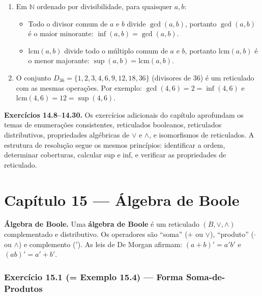 \documentclass[12pt,a4paper]{article}
\newcommand{\keyword}[1]{\textbf{\textcolor{azul}{#1}}}
\begin{document}
\begin{enumerate}[label=(\alph*)]
  \item Em $\mathbb{N}$ ordenado por divisibilidade, para quaisquer $a, b$:
        \begin{itemize}
          \item Todo o divisor comum de $a$ e $b$ divide $\gcd(a,b)$, portanto
                $\gcd(a,b)$ é o maior minorante: $\inf(a,b) = \gcd(a,b)$.
          \item $\text{lcm}(a,b)$ divide todo o múltiplo comum de $a$ e $b$, portanto
                $\text{lcm}(a,b)$ é o menor majorante: $\sup(a,b) = \text{lcm}(a,b)$.
        \end{itemize}

  \item O conjunto $D_{36} = \{1,2,3,4,6,9,12,18,36\}$ (divisores de 36) é um reticulado
        com as mesmas operações. Por exemplo: $\gcd(4,6) = 2 = \inf(4,6)$ e
        $\text{lcm}(4,6) = 12 = \sup(4,6)$.
\end{enumerate}

\medskip
\noindent\textbf{Exercícios 14.8--14.30.} Os exercícios adicionais do capítulo aprofundam
os temas de enumerações consistentes, reticulados booleanos, reticulados distributivos,
propriedades algébricas de $\vee$ e $\wedge$, e isomorfismos de reticulados. A estrutura
de resolução segue os mesmos princípios: identificar a ordem, determinar coberturas,
calcular sup e inf, e verificar as propriedades de reticulado.

\newpage
\part*{Capítulo 15 — Álgebra de Boole}

\begin{teoriacaixa}
\textbf{Álgebra de Boole.} Uma \keyword{álgebra de Boole} é um reticulado $(B, \vee, \wedge)$
complementado e distributivo. Os operadores são ``soma'' ($+$ ou $\vee$), ``produto''
($\cdot$ ou $\wedge$) e complemento ($'$). As leis de De Morgan afirmam:
$(a + b)' = a'b'$ e $(ab)' = a' + b'$.
\end{teoriacaixa}

\section*{Exercício 15.1 (= Exemplo 15.4) — Forma Soma-de-Produtos}
\end{document}
